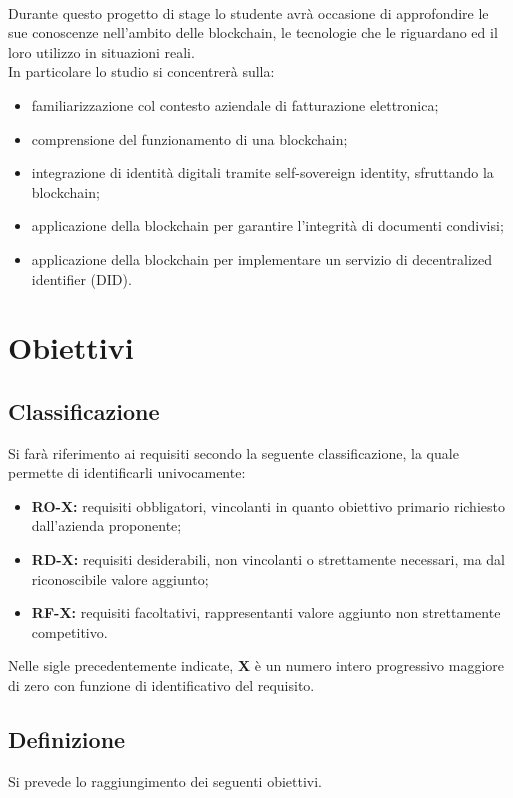 \\
Durante questo progetto di stage lo studente avrà occasione di approfondire le sue conoscenze nell'ambito delle blockchain, le tecnologie che le riguardano ed il loro utilizzo in situazioni reali.
\\
In particolare lo studio si concentrerà sulla:
\begin{itemize}
	\item familiarizzazione col contesto aziendale di fatturazione elettronica;
	\item comprensione del funzionamento di una blockchain;
	\item integrazione di identità digitali tramite self-sovereign identity, sfruttando la blockchain;
	\item applicazione della blockchain per garantire l'integrità di documenti condivisi;
	\item applicazione della blockchain per implementare un servizio di decentralized identifier (DID).
\end{itemize}


\section{Obiettivi}

\subsection*{Classificazione}
Si farà riferimento ai requisiti secondo la seguente classificazione, la quale permette di identificarli univocamente:
\begin{itemize}
	\item \textbf{RO-X:} requisiti obbligatori, vincolanti in quanto obiettivo primario richiesto dall'azienda proponente;
	\item \textbf{RD-X:} requisiti desiderabili, non vincolanti o strettamente necessari, ma dal riconoscibile valore aggiunto;
	\item \textbf{RF-X:} requisiti facoltativi, rappresentanti valore aggiunto non strettamente competitivo.
\end{itemize}

Nelle sigle precedentemente indicate, \textbf{X} è un numero intero progressivo maggiore di zero con funzione di identificativo del requisito.

\subsection*{Definizione}
Si prevede lo raggiungimento dei seguenti obiettivi.

